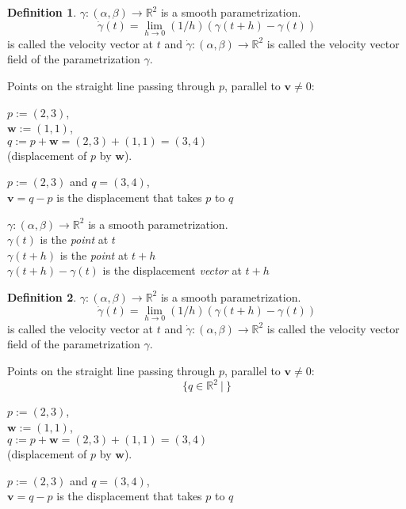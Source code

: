 \documentclass[twocolumn,20pt,fleqn]{extarticle}
\newcommand{\sep}{\vspace{0.5cm}}
\theoremstyle{plain}
\theoremstyle{definition}
\newtheorem*{definition}{Definition}
\theoremstyle{remark}
\begin{document}
\begin{definition}
$\gamma : (\alpha,\beta) \to \mathbb{R}^2$ is a smooth parametrization.
\[\dot{\gamma}(t) = \lim_{h\to 0} (1/h)(\gamma(t+h) - \gamma(t))\]
is called the velocity vector at $t$ and $\dot{\gamma} : (\alpha, \beta) \to \mathbb{R}^2$ is called the velocity vector field of the parametrization $\gamma$.
\end{definition}
\newpage
Points on the straight line passing through $p$, parallel to $\mathbf{v}\neq 0$:


\clearpage



$p := (2,3)$,\\ $\mathbf{w} := (1,1)$,\\ $q:=p + \mathbf{w} = (2,3) + (1,1) = (3,4)$ \\ (displacement of $p$ by $\mathbf{w}$).

\sep
$p := (2,3)$ and $q=(3,4)$,\\
$\mathbf{v}= q - p$ is the displacement that takes $p$ to $q$ 
\sep

$\gamma : (\alpha,\beta) \to \mathbb{R}^2$ is a smooth parametrization.\\
$\gamma(t)$ is the \emph{point} at $t$\\
$\gamma(t+h)$ is the \emph{point} at $t+h$\\
$\gamma(t+h)-\gamma(t)$ is the displacement \emph{vector} at $t+h$\\



\begin{definition}
$\gamma : (\alpha,\beta) \to \mathbb{R}^2$ is a smooth parametrization.
\[\dot{\gamma}(t) = \lim_{h\to 0} (1/h)(\gamma(t+h) - \gamma(t))\]
is called the velocity vector at $t$ and $\dot{\gamma} : (\alpha, \beta) \to \mathbb{R}^2$ is called the velocity vector field of the parametrization $\gamma$.
\end{definition}
\newpage
Points on the straight line passing through $p$, parallel to $\mathbf{v}\neq 0$:
\[\{q \in \mathbb{R}^2 \ |\ \}\]


\clearpage



$p := (2,3)$,\\ $\mathbf{w} := (1,1)$,\\ $q:=p + \mathbf{w} = (2,3) + (1,1) = (3,4)$ \\ (displacement of $p$ by $\mathbf{w}$).

\sep
$p := (2,3)$ and $q=(3,4)$,\\
$\mathbf{v}= q - p$ is the displacement that takes $p$ to $q$ 
\sep
\end{document}
